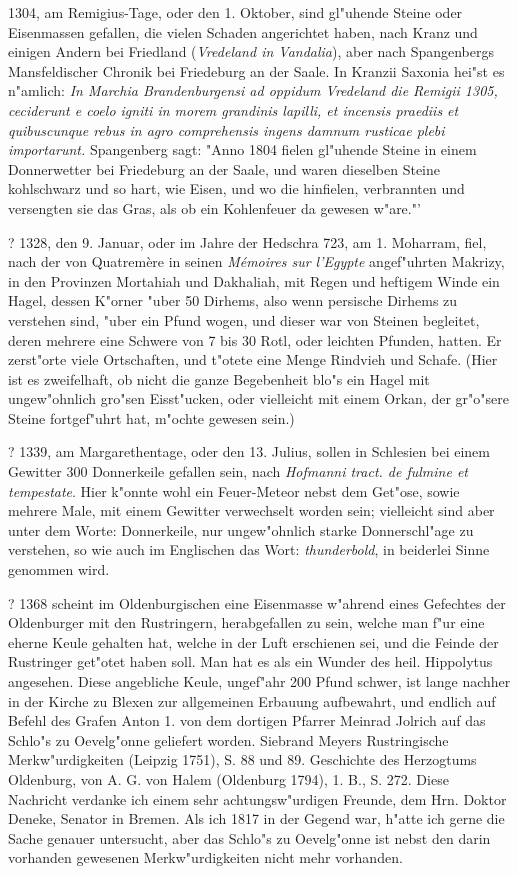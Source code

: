\documentclass[a4paper, 11pt, oneside, polutonikogreek, german]{article}
\begin{document}
1304, am Remigius-Tage, oder den 1. Oktober, sind gl"uhende Steine oder Eisenmassen gefallen, die vielen Schaden angerichtet haben, nach Kranz und einigen Andern bei Friedland (\emph{Vredeland in Vandalia}), aber nach Spangenbergs Mansfeldischer Chronik bei Friedeburg an der Saale. In Kranzii Saxonia hei"st es n"amlich: \emph{In Marchia Brandenburgensi ad oppidum Vredeland die Remigii 1305, ceciderunt e coelo igniti in morem grandinis lapilli, et incensis praediis et quibuscunque rebus in agro comprehensis ingens damnum rusticae plebi importarunt.} Spangenberg sagt: "Anno 1804 fielen gl"uhende Steine in einem Donnerwetter bei Friedeburg an der Saale, und waren dieselben Steine kohlschwarz und so hart, wie Eisen, und wo die hinfielen, verbrannten und versengten sie das Gras, als ob ein Kohlenfeuer da gewesen w"are."'

? 1328, den 9. Januar, oder im Jahre der Hedschra 723, am 1. Moharram, fiel, nach der von Quatremère in seinen \emph{Mémoires sur l'Egypte} angef"uhrten Makrizy, in den Provinzen Mortahiah und Dakhaliah, mit Regen und heftigem Winde ein Hagel, dessen K"orner "uber 50 Dirhems, also wenn persische Dirhems zu verstehen sind, "uber ein Pfund wogen, und dieser war von Steinen begleitet, deren mehrere eine Schwere von 7 bis 30 Rotl, oder leichten Pfunden, hatten. Er zerst"orte viele Ortschaften, und t"otete eine Menge Rindvieh und Schafe. (Hier ist es zweifelhaft, ob nicht die ganze Begebenheit blo"s ein Hagel mit ungew"ohnlich gro"sen Eisst"ucken, oder vielleicht mit einem Orkan, der gr"o"sere Steine fortgef"uhrt hat, m"ochte gewesen sein.)

? 1339, am Margarethentage, oder den 13. Julius, sollen in Schlesien bei einem Gewitter 300 Donnerkeile gefallen sein, nach \emph{Hofmanni tract. de fulmine et tempestate}. Hier k"onnte wohl ein Feuer-Meteor nebst dem Get"ose, sowie mehrere Male, mit einem Gewitter verwechselt worden sein; vielleicht sind aber unter dem Worte: Donnerkeile, nur ungew"ohnlich starke Donnerschl"age zu verstehen, so wie auch im Englischen das Wort: \emph{thunderbold}, in beiderlei Sinne genommen wird.

? 1368 scheint im Oldenburgischen eine Eisenmasse w"ahrend eines Gefechtes der Oldenburger mit den Rustringern, herabgefallen zu sein, welche man f"ur eine eherne Keule gehalten hat, welche in der Luft erschienen sei, und die Feinde der Rustringer get"otet haben soll. Man hat es als ein Wunder des heil. Hippolytus angesehen. Diese angebliche Keule, ungef"ahr 200 Pfund schwer, ist lange nachher in der Kirche zu Blexen zur allgemeinen Erbauung aufbewahrt, und endlich auf Befehl des Grafen Anton 1. von dem dortigen Pfarrer Meinrad Jolrich auf das Schlo"s zu Oevelg"onne geliefert worden. Siebrand Meyers Rustringische Merkw"urdigkeiten (Leipzig 1751), S. 88 und 89. Geschichte des Herzogtums Oldenburg, von A. G. von Halem (Oldenburg 1794), 1. B., S. 272. Diese Nachricht verdanke ich einem sehr achtungsw"urdigen Freunde, dem Hrn. Doktor Deneke, Senator in Bremen. Als ich 1817 in der Gegend war, h"atte ich gerne die Sache genauer untersucht, aber das Schlo"s zu Oevelg"onne ist nebst den darin vorhanden gewesenen Merkw"urdigkeiten nicht mehr vorhanden.
\end{document}
